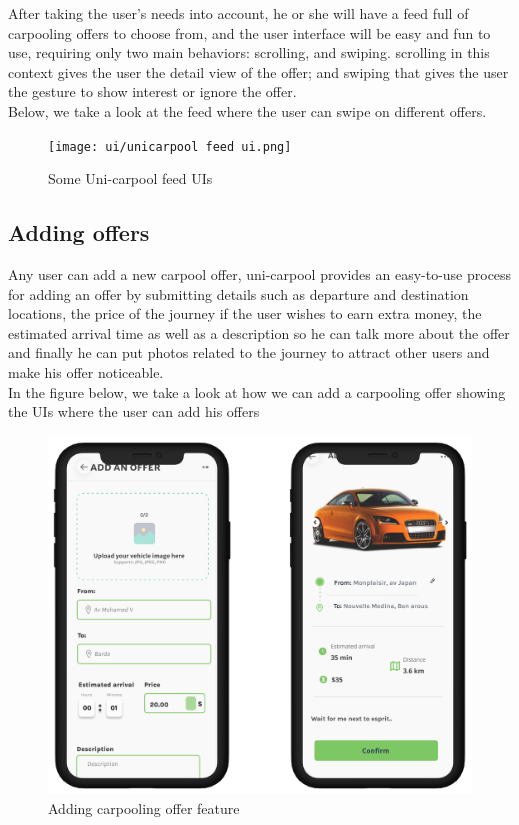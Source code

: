 After taking the user's needs into account, he or she will have a feed full of carpooling offers to choose from, and the user interface will be easy and fun to use, requiring only two main behaviors: scrolling, and swiping. scrolling in this context gives the user the detail view of the offer; and swiping that gives the user the gesture to show interest or ignore the offer.\\

Below, we take a look at the feed where the user can swipe on different offers. \\
\begin{figure}[H] 
            \centering
            \texttt{[image: ui/unicarpool feed ui.png]}
            \caption{Some Uni-carpool feed UIs} 
            \label{fig: Uni-carpool feed UIs}
\end{figure}

\subsection{Adding offers}
Any user can add a new carpool offer, uni-carpool provides an easy-to-use process for adding an offer by submitting details such as departure and destination locations, the price of the journey if the user wishes to earn extra money, the estimated arrival time as well as a description so he can talk more about the offer and finally he can put photos related to the journey to attract other users and make his offer noticeable. \\
In the figure below, we take a look at how we can add a carpooling offer showing the UIs where the user can add his offers
\begin{figure}[H] 
            \centering
            \includegraphics[scale=0.15]{ui/adding carpooling offer.png}
            \caption{Adding carpooling offer feature} 
            \label{fig: Adding carpooling offer feature UI}
\end{figure}

